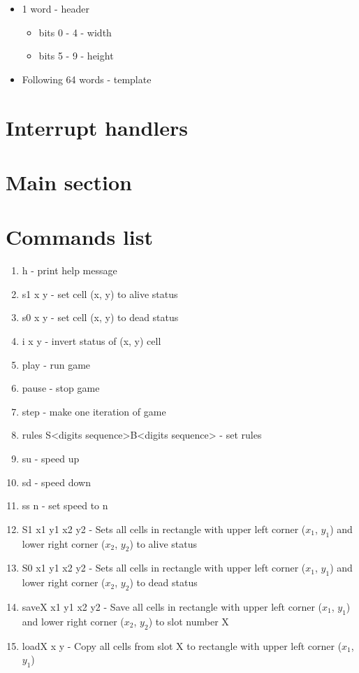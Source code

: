 \begin{itemize}
	\item 1 word - header
		\begin{itemize}
			\item bits 0 - 4 - width
			\item bits 5 - 9 - height
		\end{itemize}
	\item Following 64 words - template
\end{itemize}

\section*{Interrupt handlers}

\section*{Main section}

\section*{Commands list}

\begin{enumerate}
	\item \textsf{h} - print help message
	\item \textsf{s1 x y} - set cell (x, y) to alive status
	\item \textsf{s0 x y} - set cell (x, y) to dead status
	\item \textsf{i x y} - invert status of (x, y) cell
	\item \textsf{play} - run game
	\item \textsf{pause} - stop game
	\item \textsf{step} - make one iteration of game
	\item \textsf{rules S<digits sequence>B<digits sequence>} - set rules
	\item \textsf{su} - speed up
	\item \textsf{sd} - speed down
	\item \textsf{ss n} - set speed to n
	\item \textsf{S1 x1 y1 x2 y2} -  Sets all cells in rectangle with upper left corner ($x_{1}$, $y_{1}$) and lower right corner ($x_{2}$, $y_{2}$) to alive status
	\item \textsf{S0 x1 y1 x2 y2} -  Sets all cells in rectangle with upper left corner ($x_{1}$, $y_{1}$) and lower right corner ($x_{2}$, $y_{2}$) to dead status
	\item \textsf{saveX x1 y1 x2 y2} - Save all cells in rectangle with upper left corner ($x_{1}$, $y_{1}$) and lower right corner ($x_{2}$, $y_{2}$) to slot number X
	\item \textsf{loadX x y} - Copy all cells from slot X to rectangle with upper left corner ($x_{1}$, $y_{1}$)
\end{enumerate}

